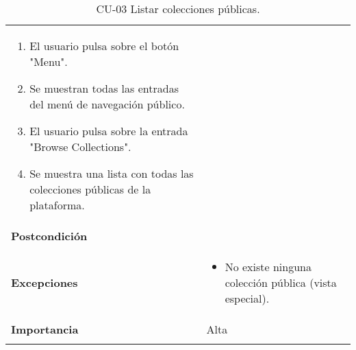 \begin{longtable}[]{@{}ll@{}}
\begin{minipage}[t]{0.72\columnwidth}
\begin{enumerate}
\def\labelenumi{\arabic{enumi}.}
\tightlist
\item
  El usuario pulsa sobre el botón "Menu".
\item
  Se muestran todas las entradas del menú de navegación público.
\item
  El usuario pulsa sobre la entrada "Browse Collections".
\item
  Se muestra una lista con todas las colecciones públicas de la
  plataforma.
\end{enumerate}\strut
\end{minipage}\tabularnewline
\begin{minipage}[t]{0.22\columnwidth}\raggedright
\textbf{Postcondición}\strut
\end{minipage} & \begin{minipage}[t]{0.72\columnwidth}\raggedright
\strut
\end{minipage}\tabularnewline
\begin{minipage}[t]{0.22\columnwidth}\raggedright
\textbf{Excepciones}\strut
\end{minipage} & \begin{minipage}[t]{0.72\columnwidth}\raggedright
\begin{itemize}
\tightlist
\item
  No existe ninguna colección pública (vista especial).
\end{itemize}\strut
\end{minipage}\tabularnewline
\begin{minipage}[t]{0.22\columnwidth}\raggedright
\textbf{Importancia}\strut
\end{minipage} & \begin{minipage}[t]{0.72\columnwidth}\raggedright
Alta\strut
\end{minipage}\tabularnewline
\bottomrule
\caption{CU-03 Listar colecciones públicas.}
\end{longtable}

